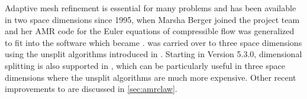 Adaptive mesh refinement is essential for many problems and has been
available in two space dimensions since 1995, when Marsha Berger
joined the project team and her AMR code for the Euler equations of
compressible flow was generalized to fit into the software which
became \amrclaw \cite{Berger:1998ia}.  \amrclaw was carried over to
three space dimensions using the unsplit algorithms introduced in
\cite{jol-rjl:3d}.  Starting in Version 5.3.0, dimensional splitting
is also supported in \amrclaw, which can be particularly useful in
three space dimensions where the unsplit algorithms are much more
expensive.  Other recent improvements to \amrclaw are discussed in
\cref{sec:amrclaw}.

